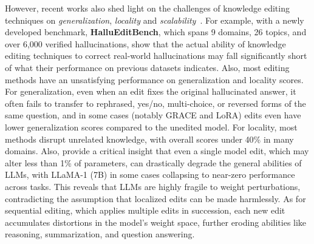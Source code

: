 However, recent works also shed light on the challenges of knowledge editing techniques on \textit{generalization}, \textit{locality} and \textit{scalability}~\citep{huang2025halluedit,hsueh2024editing,gu-etal-2024-model,hoelscher2023detecting,hua2024propagation,yang-etal-2024-butterfly,yang2024fall,li2023unveiling,cohen2024evaluating}. For example, with a newly developed benchmark, \textbf{HalluEditBench}, which spans 9 domains, 26 topics, and over 6,000 verified hallucinations, \citet{huang2025halluedit} show that the actual ability of knowledge editing techniques to correct real-world hallucinations may fall significantly short of what their performance on previous datasets indicates. Also, most editing methods have an unsatisfying performance on generalization and locality scores. For generalization, even when an edit fixes the original hallucinated answer, it often fails to transfer to rephrased, yes/no, multi-choice, or reversed forms of the same question, and in some cases (notably GRACE and LoRA) edits even have lower generalization scores compared to the unedited model. For locality, most methods disrupt unrelated knowledge, with overall scores under 40\% in many domains. Also, \citet{gu-etal-2024-model} provide a critical insight that even a single model edit, which may alter less than 1\% of parameters, can drastically degrade the general abilities of LLMs, with LLaMA-1 (7B) in some cases collapsing to near-zero performance across tasks. This reveals that LLMs are highly fragile to weight perturbations, contradicting the assumption that localized edits can be made harmlessly. As for sequential editing, which applies multiple edits in succession, each new edit accumulates distortions in the model’s weight space, further eroding abilities like reasoning, summarization, and question answering. 







